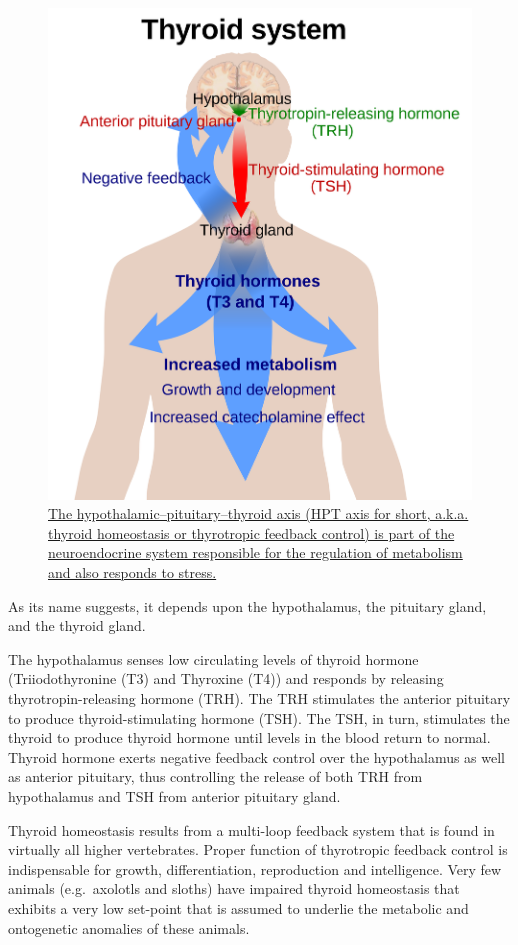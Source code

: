 \begin{figure}

{\centering \includegraphics[width=0.7\linewidth]{./figures/endocrine/Thyroid_system} 

}

\caption{\href{https://commons.wikimedia.org/wiki/File:Thyroid_system.svg}{The hypothalamic--pituitary--thyroid axis (HPT axis for short, a.k.a. thyroid homeostasis or thyrotropic feedback control) is part of the neuroendocrine system responsible for the regulation of metabolism and also responds to stress.}}\label{fig:hpthyroid}
\end{figure}

As its name suggests, it depends upon the hypothalamus, the pituitary gland, and the thyroid gland.

The hypothalamus senses low circulating levels of thyroid hormone (Triiodothyronine (T3) and Thyroxine (T4)) and responds by releasing thyrotropin-releasing hormone (TRH). The TRH stimulates the anterior pituitary to produce thyroid-stimulating hormone (TSH). The TSH, in turn, stimulates the thyroid to produce thyroid hormone until levels in the blood return to normal. Thyroid hormone exerts negative feedback control over the hypothalamus as well as anterior pituitary, thus controlling the release of both TRH from hypothalamus and TSH from anterior pituitary gland.

Thyroid homeostasis results from a multi-loop feedback system that is found in virtually all higher vertebrates. Proper function of thyrotropic feedback control is indispensable for growth, differentiation, reproduction and intelligence. Very few animals (e.g.~axolotls and sloths) have impaired thyroid homeostasis that exhibits a very low set-point that is assumed to underlie the metabolic and ontogenetic anomalies of these animals.

